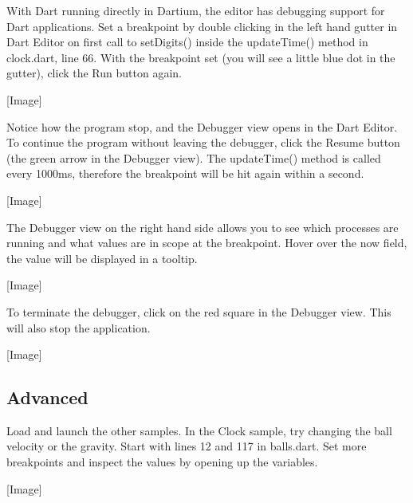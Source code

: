 With Dart running directly in Dartium, the editor has debugging support for Dart applications. Set a breakpoint by double clicking in the left hand gutter in Dart Editor on first call to setDigits() inside the updateTime() method in clock.dart, line 66. With the breakpoint set (you will see a little blue dot in the gutter), click the Run button again.

[Image]

Notice how the program stop, and the Debugger view opens in the Dart Editor. To continue the program without leaving the debugger, click the Resume button (the green arrow in the Debugger view). The updateTime() method is called every 1000ms, therefore the breakpoint will be hit again within a second.

[Image]

The Debugger view on the right hand side allows you to see which processes are running and what values are in scope at the breakpoint. Hover over the now field, the value will be displayed in a tooltip.

[Image]

To terminate the debugger, click on the red square in the Debugger view. This will also stop the application.

[Image]

\subsection{Advanced}

Load and launch the other samples.
In the Clock sample, try changing the ball velocity or the gravity. Start with lines 12 and 117 in balls.dart.
Set more breakpoints and inspect the values by opening up the variables.

[Image]
